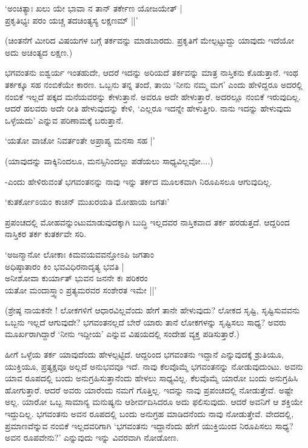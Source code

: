 \begin{shloka}
`ಅಂಚಿತ್ಯಾಃ ಖಲು ಯೇ ಭಾವಾ ನ ತಾನ್ ತರ್ಕೇಣ ಯೋಜಯೇತ್‌ |\\
ಪ್ರಕೃತಿಭ್ಯಃ ಪರಂ ಯಚ್ಚ ತದಚಿಂತ್ಯಸ್ಯ ಲಕ್ಷಣಮ್ ||'
\end{shloka}

(ಚಿಂತನೆಗೆ ಮೀರಿದ ವಿಷಯಗಳ ಬಗ್ಗೆ ತರ್ಕವನ್ನು ಮಾಡಬಾರದು. ಪ್ರಕೃತಿಗೆ ಮೇಲ್ಪಟ್ಟುದ್ದು ಯಾವುದು ಇದೆಯೋ ಅದು ಅಚಿಂತ್ಯದ ಲಕ್ಷಣ.)

ಭಗವಂತನು ಐಶ್ವರ್ಯ ಇಂತಹುದೇ, ಆದರೆ ಇದನ್ನು ಅರಿಯದೆ ತರ್ಕವನ್ನು ಮಾತ್ರ ನಾಸ್ತಿಕನು ಕೊಡುತ್ತಾನೆ. ಇಂಥ ತರ್ಕಕ್ಕೂ ಸಹ ನಂಬಿಕೆಯೇ ಕಾರಣ. ಒಬ್ಬನು ತನ್ನ ತಂದೆ, ತಾಯಿ `ನೀನು ನಮ್ಮ ಮಗ' ಎಂದು ಹೇಳಿದ್ದರೂ ಅದರಲ್ಲಿ ನಂಬಿಕೆ ಇಲ್ಲದೆ ಪಕ್ಕದ ಮನೆಯವರನ್ನು ಕೇಳುತ್ತಾನೆ. ಅವರೂ ಅದೇ ಹೇಳುತ್ತಾರೆ. ಅದರಲ್ಲೂ ನಂಬಿಕೆ ಇರುವುದಿಲ್ಲ. ಆದರೆ ಹಲವರು ಅದೇ ರೀತಿ ಹೇಳುವುದನ್ನು ಕೇಳಿ, `ಎಲ್ಲರೂ ಇದನ್ನೇ ಹೇಳುತ್ತೀರಿ. ನಾನು ಇದನ್ನು ಹೇಳುವುದು ಒಳ್ಳೆಯದು' ಎನ್ನುವ ಪರಿಣಾಮಕ್ಕೆ ಬರುತ್ತಾನೆ.

\begin{shloka}
`ಯತೋ ವಾಚೋ ನಿವರ್ತಂತೇ ಅಪ್ರಾಪ್ಯ ಮನಸಾ ಸಹ |'
\end{shloka}

(ಯಾವುದನ್ನು ವಾಕ್ಕಿನಿಂದಲೂ, ಮನಸ್ಸಿನಿಂದಲ್ಲು ಪಡೆಯಲು ಸಾಧ್ಯವಿಲ್ಲವೋ....)

-ಎಂದು ಹೇಳಿರುವಂತೆ ಭಗವಂತನನ್ನು ನಾವು ಇನ್ನು ತರ್ಕದ ಮೂಲಕವಾಗಿ ನಿರೂಪಿಸಲೂ ಆಗುವುದಿಲ್ಲ.

\begin{shloka}
`ಕುತರ್ಕೋಽಯಂ ಕಾಚಿನ್ ಮುಖರಯತಿ ಮೋಹಾಯ ಜಗತಃ'
\end{shloka}

ಪ್ರಪಂಚದಲ್ಲಿ ಮೋಹವನ್ನುಂಟುಮಾಡುವುದಕ್ಕಾಗಿ ಬುದ್ಧಿ ಇಲ್ಲದವರ ನಾಸ್ತಿಕವಾದ ತರ್ಕ ಹರಡುತ್ತದೆ. ಆದ್ದರಿಂದ ನಾಸ್ತಿಕರ ತರ್ಕ ಕುತರ್ಕವೇ ಸರಿ.

\begin{shloka}
`ಅಜನ್ಮಾನೋ ಲೋಕಾಃ ಕಿಮವಯವವನ್ತೋಽಪಿ ಜಗತಾಂ\\
ಅಧಿಷ್ಠಾತಾರಂ ಕಿಂ ಭವವಿಧಿರನಾದೃತ್ಯ ಭವತಿ |\\
ಅನೀಶೋವಾ ಕುರ್ಯಾತ್ ಭುವನ ಜನನೇ ಕಃ ಪರಿಕರಂ\\
ಯತೋ ಮಂದಾಸ್ತ್ವಾಂ ಪ್ರತ್ಯಮರವರ ಸಂಶೇರತ ಇಮೇ ||'
\end{shloka}

(ಶ್ರೇಷ್ಠ ನಾಯಕನೇ ! ಲೋಕಗಳಿಗೆ ಆಧಾರವಿಲ್ಲವೆಂದು ಹೇಗೆ ತಾನೇ ಹೇಳುವುದು? ಲೋಕದ ಸೃಷ್ಟಿ, ಸೃಷ್ಟಿಸುವವನು ಒಬ್ಬನು ಇಲ್ಲದೆ ಆಗುವುದೇ? ಭಗವಂತನಲ್ಲದೆ ಬೇರೆ ಯಾರು ತಾನೆ ಲೋಕಗಳನ್ನು ಸೃಷ್ಟಿಸಲು ಸಾಧ್ಯ? ಅವರು ಮೂರ್ಖರಾಗಿದ್ದಾರೆ `ನೀನು ಇದ್ದೀಯ' ಎನ್ನುವ ವಿಷಯದಲ್ಲಿ ಸಂದೇಹ ವ್ಯಕ್ತ ಪಡಿಸುತ್ತಾರೆ.)

ಹೀಗೆ ಒಳ್ಳೆಯ ತರ್ಕ ಯಾವುದೆಂದು ಹೇಳಲ್ಪಟ್ಟಿದೆ. ಆದ್ದರಿಂದ ಭಗವಂತನು ಇದ್ದಾನೆ ಎನ್ನುವುದಕ್ಕೆ ಶ್ರುತಿಯೂ, ಯುಕ್ತಿಯೂ, ಪ್ರತ್ಯಕ್ಷವೂ ಅಲ್ಲದೆ ಅನುಭವವೂ ಇದೆ. ನಾವು ಕೆಲವೊಮ್ಮೆ ಭಗವಂತನನ್ನು ನೋಡುವುದುಂಟು. ಅವನು ಯಾವ ರೂಪದಲ್ಲಿ ಬಂದು ಅನುಗ್ರಹಿಸುತ್ತಾನೆಂದು ಹೇಳಲು ಸಾಧ್ಯವಿಲ್ಲ. ಕೆಲವೊಮ್ಮೆ ಯಾರೋ ಬಂದು ಅನುಗ್ರಹಿಸಿ ಹೋಗುತ್ತಾರೆ. ಆದರೆ ಅವರು ಯಾರೆಂದು ನಮಗೆ ಗೊತ್ತಿಲ್ಲ. ಇದನ್ನು ನಾವು ಪ್ರಪಂಚದಲ್ಲಿ ನೋಡುತ್ತೇವೆ. ಅಷ್ಟೇ ಅಲ್ಲ. ಯಾರೋ ಒಬ್ಬ ಸಾಮಾನ್ಯ ಮನುಷ್ಯನು ಆಶೀರ್ವದಿಸಿದರೂ ಅದು ಫಲಿಸುವುದು. ಆದರೆ ಅವನಿಗೆ ಆ ಶಕ್ತಿಯೇ ಇದ್ದುದಿಲ್ಲ. ಭಗವಂತನು ಅವನ ರೂಪದಲ್ಲಿ ಬಂದು ಅನುಗ್ರಹ ಮಾಡಿದನೆಂದು ನಾವು ನೋಡುತ್ತೇವೆ. ವೇದದಲ್ಲಿ, ಪ್ರಮಾಣವೆನ್ನುವ ನಂಬಿಕೆ ಇಲ್ಲದವರಿಗಾಗಿ `ಭಗವಂತನು ಇದ್ದಾನೆಂದು ಹೇಗೆ ಯುಕ್ತಿಯಿಂದ ನಿರೂಪಿಸಲು ಸಾಧ್ಯ? ಅವನ ರೂಪವೇನು?' ಎನ್ನುವುದು ಇನ್ನು ವಿವರವಾಗಿ ನೋಡೋಣ.


